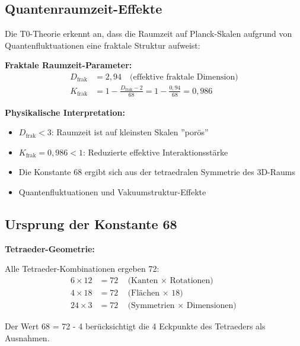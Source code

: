 \documentclass[12pt,a4paper]{article}
\begin{document}
	\subsection{Quantenraumzeit-Effekte}
	
	Die T0-Theorie erkennt an, dass die Raumzeit auf Planck-Skalen aufgrund von Quantenfluktuationen eine fraktale Struktur aufweist:
	
	\begin{keyresult}
		\textbf{Fraktale Raumzeit-Parameter:}
		\begin{align}
			D_{\text{frak}} &= 2{,}94 \quad \text{(effektive fraktale Dimension)} \\
			K_{\text{frak}} &= 1 - \frac{D_{\text{frak}} - 2}{68} = 1 - \frac{0{,}94}{68} = 0{,}986
		\end{align}
		
		\textbf{Physikalische Interpretation:}
		\begin{itemize}
			\item $D_{\text{frak}} < 3$: Raumzeit ist auf kleinsten Skalen ''porös''
			\item $K_{\text{frak}} = 0{,}986 < 1$: Reduzierte effektive Interaktionsstärke
			\item Die Konstante 68 ergibt sich aus der tetraedralen Symmetrie des 3D-Raums
			\item Quantenfluktuationen und Vakuumstruktur-Effekte
		\end{itemize}
	\end{keyresult}
	
	\subsection{Ursprung der Konstante 68}
	
	\begin{alternative}
		\textbf{Tetraeder-Geometrie:}
		
		Alle Tetraeder-Kombinationen ergeben 72:
		\begin{align}
			6 \times 12 &= 72 \quad \text{(Kanten $\times$ Rotationen)} \\
			4 \times 18 &= 72 \quad \text{(Flächen $\times$ 18)} \\
			24 \times 3 &= 72 \quad \text{(Symmetrien $\times$ Dimensionen)}
		\end{align}
		
		Der Wert 68 = 72 - 4 berücksichtigt die 4 Eckpunkte des Tetraeders als Ausnahmen.
	\end{alternative}
	
\end{document}
